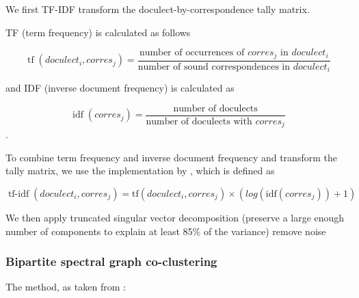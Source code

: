 \documentclass[a4paper]{article}
\begin{document}
We first TF-IDF transform the doculect-by-correspondence tally matrix.


TF (term frequency) is calculated as follows

\begin{equation*}
\operatorname{tf}(doculect_i, corres_j) =
\frac{\text{number of occurrences of } corres_j \text{ in } doculect_i}
{\text{number of sound correspondences in } doculect_i}
\end{equation*}

and IDF (inverse document frequency) is calculated as

\begin{equation*}
\operatorname{idf}(corres_j) =
\frac{\text{number of doculects}}
{\text{number of doculects with } corres_j}
\end{equation*}
.

To combine term frequency and inverse document frequency and transform the tally matrix, 
we use the implementation by \cite{pedregosa2011scikit-learn}, 
which is defined as

\begin{equation*}
\operatorname{tf-idf}(doculect_i, corres_j) =
\text{tf}(doculect_i, corres_j)
\times
(
log
(\text{idf}(corres_j))
+ 1)
\end{equation*}

We then apply truncated singular vector decomposition (preserve a large enough number of components to explain at least 85\% of the variance)
remove noise



\subsubsection{Bipartite spectral graph co-clustering}

The method, as taken from \citet{dhillon2001co-clustering}:
\end{document}
